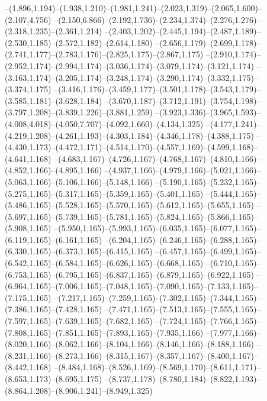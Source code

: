   --(1.896,1.194)--(1.938,1.210)--(1.981,1.241)--(2.023,1.319)--(2.065,1.600)--(2.107,4.756)%
  --(2.150,6.866)--(2.192,1.736)--(2.234,1.374)--(2.276,1.276)--(2.318,1.235)--(2.361,1.214)%
  --(2.403,1.202)--(2.445,1.194)--(2.487,1.189)--(2.530,1.185)--(2.572,1.182)--(2.614,1.180)%
  --(2.656,1.179)--(2.699,1.178)--(2.741,1.177)--(2.783,1.176)--(2.825,1.175)--(2.867,1.175)%
  --(2.910,1.174)--(2.952,1.174)--(2.994,1.174)--(3.036,1.174)--(3.079,1.174)--(3.121,1.174)%
  --(3.163,1.174)--(3.205,1.174)--(3.248,1.174)--(3.290,1.174)--(3.332,1.175)--(3.374,1.175)%
  --(3.416,1.176)--(3.459,1.177)--(3.501,1.178)--(3.543,1.179)--(3.585,1.181)--(3.628,1.184)%
  --(3.670,1.187)--(3.712,1.191)--(3.754,1.198)--(3.797,1.208)--(3.839,1.226)--(3.881,1.259)%
  --(3.923,1.336)--(3.965,1.593)--(4.008,4.018)--(4.050,7.707)--(4.092,1.660)--(4.134,1.325)%
  --(4.177,1.241)--(4.219,1.208)--(4.261,1.193)--(4.303,1.184)--(4.346,1.178)--(4.388,1.175)%
  --(4.430,1.173)--(4.472,1.171)--(4.514,1.170)--(4.557,1.169)--(4.599,1.168)--(4.641,1.168)%
  --(4.683,1.167)--(4.726,1.167)--(4.768,1.167)--(4.810,1.166)--(4.852,1.166)--(4.895,1.166)%
  --(4.937,1.166)--(4.979,1.166)--(5.021,1.166)--(5.063,1.166)--(5.106,1.166)--(5.148,1.166)%
  --(5.190,1.165)--(5.232,1.165)--(5.275,1.165)--(5.317,1.165)--(5.359,1.165)--(5.401,1.165)%
  --(5.444,1.165)--(5.486,1.165)--(5.528,1.165)--(5.570,1.165)--(5.612,1.165)--(5.655,1.165)%
  --(5.697,1.165)--(5.739,1.165)--(5.781,1.165)--(5.824,1.165)--(5.866,1.165)--(5.908,1.165)%
  --(5.950,1.165)--(5.993,1.165)--(6.035,1.165)--(6.077,1.165)--(6.119,1.165)--(6.161,1.165)%
  --(6.204,1.165)--(6.246,1.165)--(6.288,1.165)--(6.330,1.165)--(6.373,1.165)--(6.415,1.165)%
  --(6.457,1.165)--(6.499,1.165)--(6.542,1.165)--(6.584,1.165)--(6.626,1.165)--(6.668,1.165)%
  --(6.710,1.165)--(6.753,1.165)--(6.795,1.165)--(6.837,1.165)--(6.879,1.165)--(6.922,1.165)%
  --(6.964,1.165)--(7.006,1.165)--(7.048,1.165)--(7.090,1.165)--(7.133,1.165)--(7.175,1.165)%
  --(7.217,1.165)--(7.259,1.165)--(7.302,1.165)--(7.344,1.165)--(7.386,1.165)--(7.428,1.165)%
  --(7.471,1.165)--(7.513,1.165)--(7.555,1.165)--(7.597,1.165)--(7.639,1.165)--(7.682,1.165)%
  --(7.724,1.165)--(7.766,1.165)--(7.808,1.165)--(7.851,1.165)--(7.893,1.165)--(7.935,1.166)%
  --(7.977,1.166)--(8.020,1.166)--(8.062,1.166)--(8.104,1.166)--(8.146,1.166)--(8.188,1.166)%
  --(8.231,1.166)--(8.273,1.166)--(8.315,1.167)--(8.357,1.167)--(8.400,1.167)--(8.442,1.168)%
  --(8.484,1.168)--(8.526,1.169)--(8.569,1.170)--(8.611,1.171)--(8.653,1.173)--(8.695,1.175)%
  --(8.737,1.178)--(8.780,1.184)--(8.822,1.193)--(8.864,1.208)--(8.906,1.241)--(8.949,1.325)%
